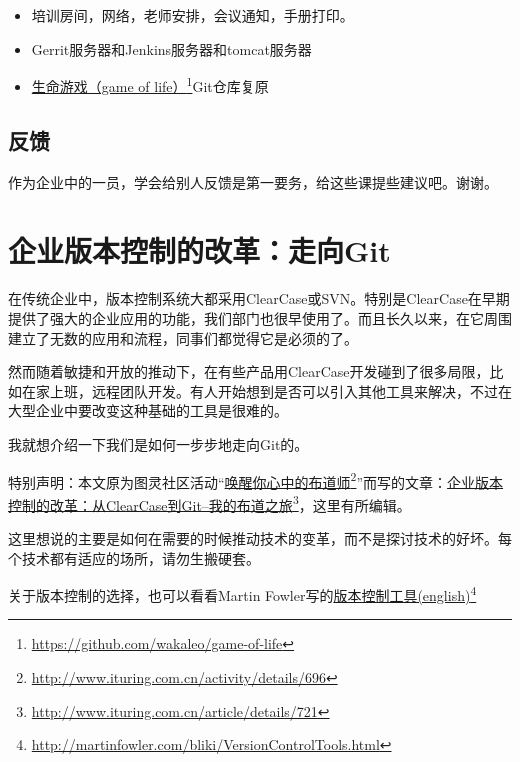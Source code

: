 \begin{itemize}
\item 培训房间，网络，老师安排，会议通知，手册打印。

\item Gerrit服务器和Jenkins服务器和tomcat服务器

\item \href{https://github.com/wakaleo/game-of-life}{生命游戏（game of life）}\footnote{\href{https://github.com/wakaleo/game-of-life}{https:/\slash github.com\slash wakaleo\slash game-of-life}}Git仓库复原

\end{itemize}

\section{反馈}
\label{反馈}

作为企业中的一员，学会给别人反馈是第一要务，给这些课提些建议吧。谢谢。

\chapter{企业版本控制的改革：走向Git}
\label{企业版本控制的改革：走向git}

在传统企业中，版本控制系统大都采用ClearCase或SVN。特别是ClearCase在早期提供了强大的企业应用的功能，我们部门也很早使用了。而且长久以来，在它周围建立了无数的应用和流程，同事们都觉得它是必须的了。

然而随着敏捷和开放的推动下，在有些产品用ClearCase开发碰到了很多局限，比如在家上班，远程团队开发。有人开始想到是否可以引入其他工具来解决，不过在大型企业中要改变这种基础的工具是很难的。

我就想介绍一下我们是如何一步步地走向Git的。

特别声明：本文原为图灵社区活动“\href{http://www.ituring.com.cn/activity/details/696}{唤醒你心中的布道师}\footnote{\href{http://www.ituring.com.cn/activity/details/696}{http:/\slash www.ituring.com.cn\slash activity\slash details\slash 696}}”而写的文章：\href{http://www.ituring.com.cn/article/details/721}{企业版本控制的改革：从ClearCase到Git--我的布道之旅}\footnote{\href{http://www.ituring.com.cn/article/details/721}{http:/\slash www.ituring.com.cn\slash article\slash details\slash 721}}，这里有所编辑。

这里想说的主要是如何在需要的时候推动技术的变革，而不是探讨技术的好坏。每个技术都有适应的场所，请勿生搬硬套。

关于版本控制的选择，也可以看看Martin Fowler写的\href{http://martinfowler.com/bliki/VersionControlTools.html}{版本控制工具(english)}\footnote{\href{http://martinfowler.com/bliki/VersionControlTools.html}{http:/\slash martinfowler.com\slash bliki\slash VersionControlTools.html}}

